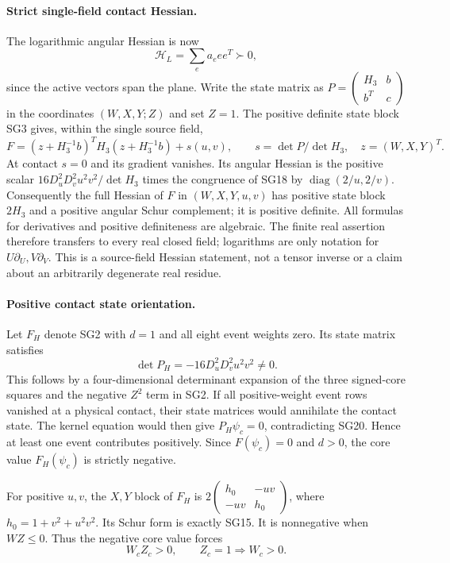 \paragraph{Strict single-field contact Hessian.}
The logarithmic angular Hessian is now
\[
                 \mathcal H_L=\sum_e a_e ee^T\succ0,       \tag{SG18}
\]
since the active vectors span the plane.  Write the state matrix
as $P=\left(\begin{smallmatrix}H_3&b\\b^T&c\end{smallmatrix}\right)$
in the coordinates $(W,X,Y;Z)$ and set $Z=1$.
The positive definite state block SG3 gives, within the single
source field,
\[
 F=(z+H_3^{-1}b)^TH_3(z+H_3^{-1}b)+s(u,v),
 \qquad s=\det P/\det H_3,\quad z=(W,X,Y)^T.             \tag{SG19}
\]
At contact $s=0$ and its gradient vanishes.  Its angular Hessian
is the positive scalar $16D_u^2D_v^2u^2v^2/\det H_3$ times
the congruence of SG18 by $\operatorname{diag}(2/u,2/v)$.
Consequently the full Hessian of $F$ in $(W,X,Y,u,v)$ has
positive state block $2H_3$ and a positive angular Schur complement;
it is positive definite.  All formulas for derivatives and
positive definiteness are algebraic.  The finite real assertion
therefore transfers to every real closed field; logarithms are
only notation for $U\partial_U,V\partial_V$.
This is a source-field Hessian statement, not a tensor inverse
or a claim about an arbitrarily degenerate real residue.

\paragraph{Positive contact state orientation.}
Let $F_H$ denote SG2 with $d=1$ and all eight event weights zero.
Its state matrix satisfies
\[
              \det P_H=-16D_u^2D_v^2u^2v^2\ne0.          \tag{SG20}
\]
This follows by a four-dimensional determinant expansion of the
three signed-core squares and the negative $Z^2$ term in SG2.
If all positive-weight event rows vanished at a physical contact,
their state matrices would annihilate the contact state.  The
kernel equation would then give $P_H\psi_c=0$, contradicting
SG20.  Hence at least one event contributes positively.  Since
$F(\psi_c)=0$ and $d>0$, the core value $F_H(\psi_c)$ is strictly
negative.

For positive $u,v$, the $X,Y$ block of $F_H$ is
$2\left(\begin{smallmatrix}h_0&-uv\\-uv&h_0\end{smallmatrix}\right)$,
where $h_0=1+v^2+u^2v^2$.  Its Schur form is exactly SG15.
It is nonnegative when $WZ\le0$.  Thus the negative core value
forces
\[
                  W_cZ_c>0,\qquad Z_c=1\Longrightarrow W_c>0.
                                                               \tag{SG21}
\]

